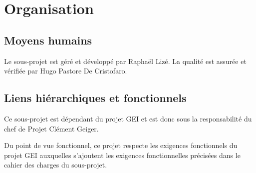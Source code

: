 \section{Organisation}

\subsection{Moyens humains}
Le sous-projet est géré et développé par Raphaël Lizé.
La qualité est assurée et vérifiée par Hugo Pastore De Cristofaro.

\subsection{Liens hiérarchiques et fonctionnels}

Ce sous-projet est dépendant du projet GEI et est donc sous la responsabilité 
du chef de Projet Clément Geiger.

Du point de vue fonctionnel, ce projet respecte les exigences fonctionnels du 
projet GEI auxquelles s'ajoutent les exigences fonctionnelles précisées dans 
le cahier des charges du sous-projet.
